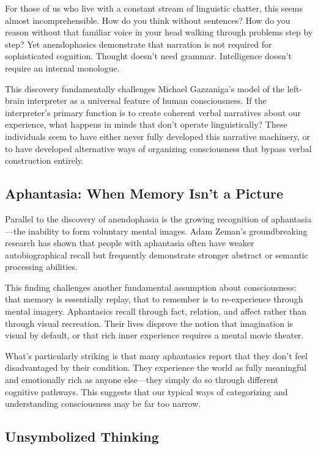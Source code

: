 For those of us who live with a constant stream of linguistic chatter, this seems almost incomprehensible. How do you think without sentences? How do you reason without that familiar voice in your head walking through problems step by step? Yet anendophasics demonstrate that narration is not required for sophisticated cognition. Thought doesn't need grammar. Intelligence doesn't require an internal monologue.

This discovery fundamentally challenges Michael Gazzaniga's model of the left-brain interpreter as a universal feature of human consciousness. If the interpreter's primary function is to create coherent verbal narratives about our experience, what happens in minds that don't operate linguistically? These individuals seem to have either never fully developed this narrative machinery, or to have developed alternative ways of organizing consciousness that bypass verbal construction entirely.

\subsection{Aphantasia: When Memory Isn't a Picture}

Parallel to the discovery of anendophasia is the growing recognition of aphantasia—the inability to form voluntary mental images. Adam Zeman's groundbreaking research has shown that people with aphantasia often have weaker autobiographical recall but frequently demonstrate stronger abstract or semantic processing abilities.

This finding challenges another fundamental assumption about consciousness: that memory is essentially replay, that to remember is to re-experience through mental imagery. Aphantasics recall through fact, relation, and affect rather than through visual recreation. Their lives disprove the notion that imagination is visual by default, or that rich inner experience requires a mental movie theater.

What's particularly striking is that many aphantasics report that they don't feel disadvantaged by their condition. They experience the world as fully meaningful and emotionally rich as anyone else—they simply do so through different cognitive pathways. This suggests that our typical ways of categorizing and understanding consciousness may be far too narrow.

\subsection{Unsymbolized Thinking}

